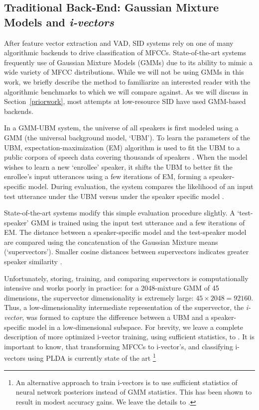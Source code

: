 \documentclass[journal,12pt,onecolumn,draftclsnofoot,]{sty/IEEEtran}
\begin{document}
\subsection{Traditional Back-End: Gaussian Mixture Models and \textit{i-vectors}}
\label{tradbackend}
After feature vector extraction and VAD, SID systems rely on one of many algorithmic backends to drive classification of MFCCs. State-of-the-art systems frequently use of Gaussian Mixture Models (GMMs) due to its ability to mimic a wide variety of MFCC distributions. While we will not be using GMMs in this work, we briefly describe the method to familiarize an interested reader with the algorithmic benchmarks to which we will compare against. As we will discuss in Section~\ref{priorwork}, most attempts at low-resource SID have used GMM-based backends.

In a GMM-UBM system, the universe of all speakers is first modeled using a GMM (the universal background model, `UBM’). To learn the parameters of the UBM, expectation-maximization (EM) algorithm is used to fit the UBM to a public corpora of speech data covering thousands of speakers \cite{ubm2}. When the model wishes to learn a new `enrollee’ speaker, it shifts the UBM to better fit the enrollee’s input utterances using a few iterations of EM, forming a speaker-specific model. During evaluation, the system compares the likelihood of an input test utterance under the UBM versus under the speaker specific model \cite{ubm}.

State-of-the-art systems modify this simple evaluation procedure slightly. A `test-speaker’ GMM is trained using the input test utterance and a few iterations of EM. The distance between a speaker-specific model and the test-speaker model are compared using the concatenation of the Gaussian Mixture means (`supervectors’). Smaller cosine distances between supervectors indicates greater speaker similarity \cite{supervector}.

Unfortunately, storing, training, and comparing supervectors is computationally intensive and works poorly in practice: for a 2048-mixture GMM of 45 dimensions, the supervector dimensionality is extremely large: $45 \times 2048 = 92160$. Thus, a low-dimensionality intermediate representation of the supervector, the \textit{i-vector}, was formed to capture the difference between a UBM and a speaker-specific model in a low-dimensional subspace. For brevity, we leave a complete description of more optimized i-vector training, using sufficient statistics, to \cite{ivector_ss}. It is important to know, that transforming MFCCs to i-vector’s, and classifying i-vectors using PLDA is currently state of the art \cite{ivector_stateofart} \footnote{An alternative approach to train i-vectors is to use sufficient statistics of neural network posteriors instead of GMM statistics. This has been shown to result in modest accuracy gains. We leave the details to \cite{ivector_dnn_posterior}.}
\end{document}
